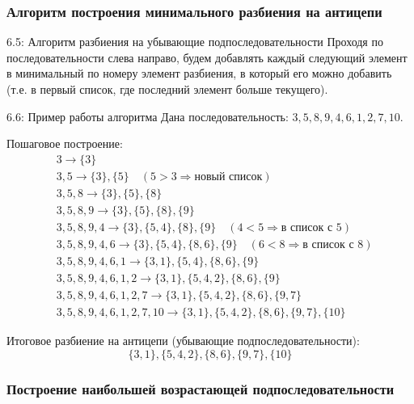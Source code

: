 \documentclass[a4paper,12pt]{article}
\begin{document}
	\subsubsection{Алгоритм построения минимального разбиения на антицепи}
	
	\begin{algorithmbox}{6.5: Алгоритм разбиения на убывающие подпоследовательности}
		Проходя по последовательности слева направо, будем добавлять каждый следующий элемент в минимальный по номеру элемент разбиения, в который его можно добавить (т.е. в первый список, где последний элемент больше текущего).
	\end{algorithmbox}
	
	\begin{examplebox}{6.6: Пример работы алгоритма}
		Дана последовательность: $3, 5, 8, 9, 4, 6, 1, 2, 7, 10$.
		
		Пошаговое построение:
		\begin{align*}
			&3 \to \{3\} \\
			&3, 5 \to \{3\}, \{5\} \quad (5 > 3 \Rightarrow \text{новый список}) \\
			&3, 5, 8 \to \{3\}, \{5\}, \{8\} \\
			&3, 5, 8, 9 \to \{3\}, \{5\}, \{8\}, \{9\} \\
			&3, 5, 8, 9, 4 \to \{3\}, \{5, 4\}, \{8\}, \{9\} \quad (4 < 5 \Rightarrow \text{в список с }5) \\
			&3, 5, 8, 9, 4, 6 \to \{3\}, \{5, 4\}, \{8, 6\}, \{9\} \quad (6 < 8 \Rightarrow \text{в список с }8) \\
			&3, 5, 8, 9, 4, 6, 1 \to \{3, 1\}, \{5, 4\}, \{8, 6\}, \{9\} \\
			&3, 5, 8, 9, 4, 6, 1, 2 \to \{3, 1\}, \{5, 4, 2\}, \{8, 6\}, \{9\} \\
			&3, 5, 8, 9, 4, 6, 1, 2, 7 \to \{3, 1\}, \{5, 4, 2\}, \{8, 6\}, \{9, 7\} \\
			&3, 5, 8, 9, 4, 6, 1, 2, 7, 10 \to \{3, 1\}, \{5, 4, 2\}, \{8, 6\}, \{9, 7\}, \{10\}
		\end{align*}
		
		Итоговое разбиение на антицепи (убывающие подпоследовательности):
		\[ \{3, 1\}, \{5, 4, 2\}, \{8, 6\}, \{9, 7\}, \{10\} \]
	\end{examplebox}
	
	\subsubsection{Построение наибольшей возрастающей подпоследовательности}
	
\end{document}

